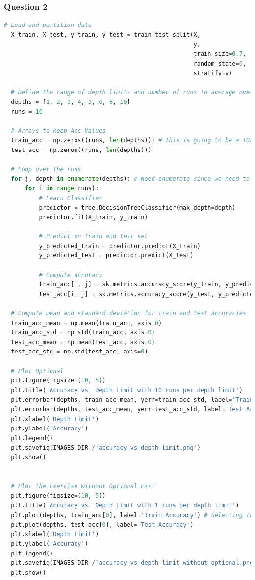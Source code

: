 \documentclass{article}
\begin{document}
\subsubsection*{Question 2}
\begin{lstlisting}[language=Python]
  # Load and partition data
  X_train, X_test, y_train, y_test = train_test_split(X,
                                                      y,
                                                      train_size=0.7,
                                                      random_state=0,
                                                      stratify=y)
  
  # Define the range of depth limits and number of runs to average over
  depths = [1, 2, 3, 4, 5, 6, 8, 10]
  runs = 10
  
  # Arrays to keep Acc Values
  train_acc = np.zeros((runs, len(depths))) # This is going to be a 10x8 array, because we want to keep all the accuracies for each run
  test_acc = np.zeros((runs, len(depths)))
  
  # Loop over the runs
  for j, depth in enumerate(depths): # Need enumerate since we need to index the depths to keep in arrays
      for i in range(runs):
          # Learn Classifier
          predictor = tree.DecisionTreeClassifier(max_depth=depth)
          predictor.fit(X_train, y_train)
  
          # Predict on train and test set
          y_predicted_train = predictor.predict(X_train)
          y_predicted_test = predictor.predict(X_test)
  
          # Compute accuracy
          train_acc[i, j] = sk.metrics.accuracy_score(y_train, y_predicted_train)
          test_acc[i, j] = sk.metrics.accuracy_score(y_test, y_predicted_test)
  
  # Compute mean and standard deviation for train and test accuracies
  train_acc_mean = np.mean(train_acc, axis=0)
  train_acc_std = np.std(train_acc, axis=0)
  test_acc_mean = np.mean(test_acc, axis=0)
  test_acc_std = np.std(test_acc, axis=0)
  
  # Plot Optional
  plt.figure(figsize=(10, 5))
  plt.title('Accuracy vs. Depth Limit with 10 runs per depth limit')
  plt.errorbar(depths, train_acc_mean, yerr=train_acc_std, label='Train Accuracy')
  plt.errorbar(depths, test_acc_mean, yerr=test_acc_std, label='Test Accuracy')
  plt.xlabel('Depth Limit')
  plt.ylabel('Accuracy')
  plt.legend()
  plt.savefig(IMAGES_DIR /'accuracy_vs_depth_limit.png')
  plt.show()
  
  
  # Plot the Exercise without Optional Part
  plt.figure(figsize=(10, 5))
  plt.title('Accuracy vs. Depth Limit with 1 runs per depth limit')
  plt.plot(depths, train_acc[0], label='Train Accuracy') # Selecting the first run for each depth limit
  plt.plot(depths, test_acc[0], label='Test Accuracy')
  plt.xlabel('Depth Limit')
  plt.ylabel('Accuracy')
  plt.legend()
  plt.savefig(IMAGES_DIR /'accuracy_vs_depth_limit_without_optional.png')
  plt.show()
  
\end{lstlisting}
\end{document}
